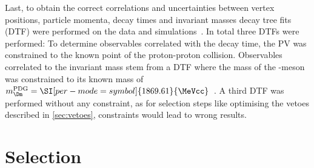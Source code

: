 Last, to obtain the correct correlations and uncertainties between vertex positions, particle momenta, decay times and invariant masses decay tree fits (DTF) were performed on the data and simulations~\cite{2005NIMPA}.
In total three DTFs were performed: To determine observables correlated with the decay time, the \ac{PV} was constrained to the known point of the proton-proton collision.
Observables correlated to the invariant mass stem from a DTF where the mass of the \Dm-meson was constrained to its known mass of $m_\Dm^{\text{PDG}}=\SI[per-mode=symbol]{1869.61}{\MeVcc}$~\cite{PDG_2017}.
A third DTF was performed without any constraint, as for selection steps like optimising the vetoes described in \cref{sec:vetoes}, constraints would lead to wrong results.

\section{Selection}
\label{sec:selection}

